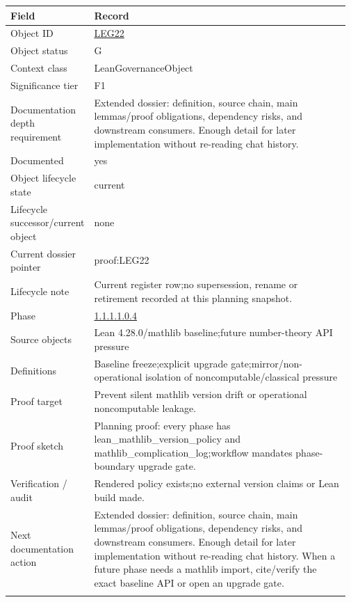 \begin{longtable}{L{0.16\linewidth} L{0.81\linewidth}}
\hline
\textbf{Field} & \textbf{Record}\\
\hline
Object ID & \hyperlink{object-row-LEG22}{LEG22}\\
\hline\addlinespace[0.20em]
Object status & G\\
\hline\addlinespace[0.20em]
Context class & LeanGovernanceObject\\
\hline\addlinespace[0.20em]
Significance tier & F1\\
\hline\addlinespace[0.20em]
Documentation depth requirement & Extended dossier: definition, source chain, main lemmas/\allowbreak{}proof obligations, dependency risks, and downstream consumers. Enough detail for later implementation without re-reading chat history.\\
\hline\addlinespace[0.20em]
Documented & yes\\
\hline\addlinespace[0.20em]
Object lifecycle state & current\\
\hline\addlinespace[0.20em]
Lifecycle successor/\allowbreak{}current object & none\\
\hline\addlinespace[0.20em]
Current dossier pointer & proof:LEG22\\
\hline\addlinespace[0.20em]
Lifecycle note & Current register row;\newline no supersession, rename or retirement recorded at this planning snapshot.\\
\hline\addlinespace[0.20em]
Phase & \hyperlink{phase-row-1-1-1-1-0-4}{1.1.1.1.0.4}\\
\hline\addlinespace[0.20em]
Source objects & Lean 4.28.0/\allowbreak{}mathlib baseline;\newline future number-theory API pressure\\
\hline\addlinespace[0.20em]
Definitions & Baseline freeze;\newline explicit upgrade gate;\newline mirror/\allowbreak{}non-operational isolation of noncomputable/\allowbreak{}classical pressure\\
\hline\addlinespace[0.20em]
Proof target & Prevent silent mathlib version drift or operational noncomputable leakage.\\
\hline\addlinespace[0.20em]
Proof sketch & Planning proof: every phase has lean\_mathlib\_version\_policy and mathlib\_complication\_log;\newline workflow mandates phase-boundary upgrade gate.\\
\hline\addlinespace[0.20em]
Verification /\allowbreak{} audit & Rendered policy exists;\newline no external version claims or Lean build made.\\
\hline\addlinespace[0.20em]
Next documentation action & Extended dossier: definition, source chain, main lemmas/\allowbreak{}proof obligations, dependency risks, and downstream consumers. Enough detail for later implementation without re-reading chat history. When a future phase needs a mathlib import, cite/\allowbreak{}verify the exact baseline API or open an upgrade gate.\\
\hline\addlinespace[0.20em]
\end{longtable}
